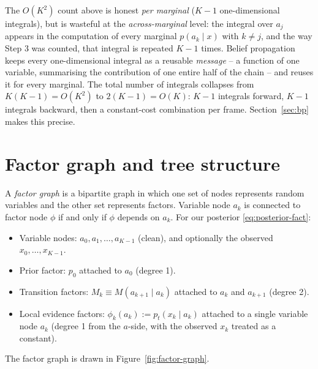 \documentclass[11pt]{article}
\theoremstyle{definition}
\begin{document}
\begin{intuition}
The \(O(K^2)\) count above is honest \emph{per marginal} (\(K - 1\)
one-dimensional integrals), but is wasteful at the \emph{across-marginal}
level: the integral over \(a_j\) appears in the computation of every
marginal \(p(a_k \mid x)\) with \(k \neq j\), and the way Step 3 was
counted, that integral is repeated \(K - 1\) times. Belief propagation
keeps every one-dimensional integral as a reusable
\emph{message} -- a function of one variable, summarising the
contribution of one entire half of the chain -- and reuses it for
every marginal. The total number of integrals collapses from
\(K (K - 1) = O(K^2)\) to \(2 (K - 1) = O(K)\): \(K - 1\) integrals
forward, \(K - 1\) integrals backward, then a constant-cost
combination per frame. Section~\ref{sec:bp} makes this precise.
\end{intuition}

\section{Factor graph and tree structure}\label{sec:factor-graph}

A \emph{factor graph}
\citep{KschischangFreyLoeliger2001, MezardMontanari2009} is a
bipartite graph in which one set of nodes represents random variables
and the other set represents factors.
Variable node \(a_k\) is connected to factor node \(\phi\) if and only
if \(\phi\) depends on \(a_k\). For our posterior
\eqref{eq:posterior-fact}:
\begin{itemize}[leftmargin=1.4em, topsep=2pt, itemsep=1pt]
\item Variable nodes: \(a_0, a_1, \dots, a_{K-1}\) (clean), and
optionally the observed \(x_0, \dots, x_{K-1}\).
\item Prior factor: \(p_0\) attached to \(a_0\) (degree 1).
\item Transition factors: \(M_k \equiv M(a_{k+1} \mid a_k)\) attached
to \(a_k\) and \(a_{k+1}\) (degree 2).
\item Local evidence factors: \(\phi_k(a_k) := p_t(x_k \mid a_k)\)
attached to a single variable node \(a_k\) (degree 1 from the
\(a\)-side, with the observed \(x_k\) treated as a constant).
\end{itemize}
The factor graph is drawn in Figure~\ref{fig:factor-graph}.
\end{document}
